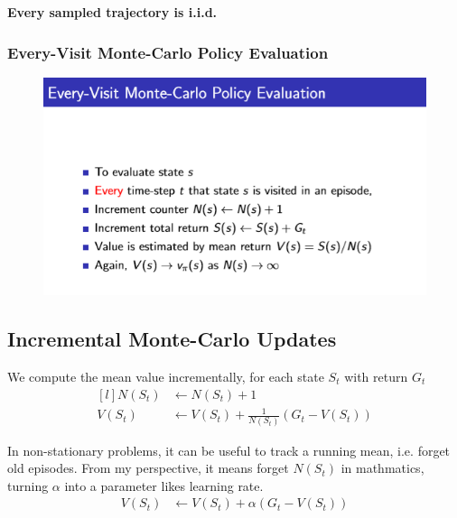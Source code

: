 \documentclass[12pt, a4paper]{paper}
\begin{document}
\textbf{Every sampled trajectory is i.i.d.}

\subsubsection{Every-Visit Monte-Carlo Policy Evaluation}
\begin{figure}[h]
	\begin{center}
		\includegraphics[width = \linewidth]{everyVisit.png}
	\end{center}
\end{figure}

\subsection{Incremental Monte-Carlo Updates}

We compute the mean value incrementally, for each state $S_{t}$ with return $G_{t}$
\begin{equation*}
	\begin{aligned}[l]
		N(S_{t}) &\leftarrow N(S_{t}) + 1 \\
		V(S_{t}) &\leftarrow V(S_{t}) + \frac{1}{N(S_{t})}(G_{t} - V(S_{t}))
	\end{aligned}
\end{equation*}

In non-stationary problems, it can be useful to track a running mean, i.e. forget old episodes. From my perspective,
it means forget $N(S_{t})$ in mathmatics, turning $\alpha$ into a parameter likes learning rate.
\begin{equation*}
	\begin{aligned}
		V(S_{t}) &\leftarrow V(S_{t}) + \alpha (G_{t} - V(S_{t}))
	\end{aligned}
\end{equation*}
\end{document}
